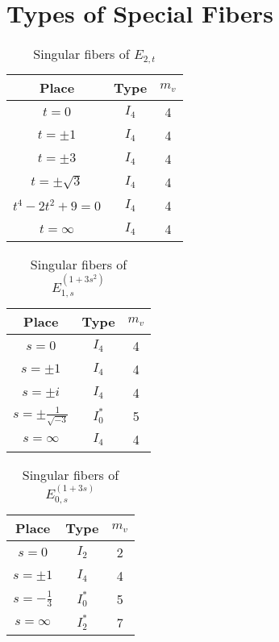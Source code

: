 \documentclass[main]{subfiles}
\begin{document}
\chapter{Types of Special Fibers}

\begin{table}[h]
    \centering
    \caption{Singular fibers of $E_{2,t}$}
    \begin{tabular}{|c|c|c|}
        \hline
        Place            & Type  & $m_v$ \\
        \hline
        $t=0$            & $I_4$ & 4     \\
        $t=\pm 1$        & $I_4$ & 4     \\
        $t=\pm 3$        & $I_4$ & 4     \\
        $t=\pm \sqrt{3}$ & $I_4$ & 4     \\
        $t^4-2t^2+9=0$   & $I_4$ & 4     \\
        $t=\infty$       & $I_4$ & 4     \\
        \hline
    \end{tabular}
\end{table}

\begin{table}[h]
    \centering
    \caption{Singular fibers of $E_{1,s}^{(1 + 3s^{2})}$}
    \begin{tabular}{|c|c|c|}
        \hline
        Place                        & Type    & $m_v$ \\
        \hline
        $s=0$                        & $I_4$   & 4     \\
        $s=\pm 1$                    & $I_4$   & 4     \\
        $s=\pm i$                    & $I_4$   & 4     \\
        $s=\pm \frac{1}{\sqrt{-3}} $ & $I_0^*$ & 5     \\
        $s=\infty$                   & $I_4$   & 4     \\
        \hline
    \end{tabular}
\end{table}

\begin{table}[h]
    \centering
    \caption{Singular fibers of $E_{0,s}^{(1 + 3s)}$}
    \begin{tabular}{|c|c|c|}
        \hline
        Place            & Type    & $m_v$ \\
        \hline
        $s=0$            & $I_2$   & 2     \\
        $s=\pm 1$        & $I_4$   & 4     \\
        $s=-\frac{1}{3}$ & $I_0^*$ & 5     \\
        $s=\infty$       & $I_2^*$ & 7     \\
        \hline
    \end{tabular}
\end{table}
\end{document}
